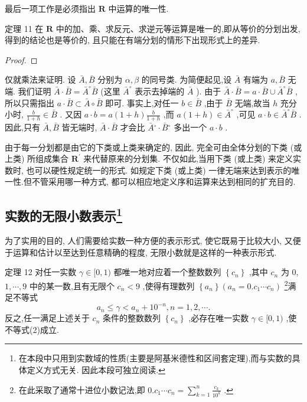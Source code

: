 最后一项工作是必须指出 \(\mathbf{R}\) 中运算的唯一性.

定理 11 在 \(\mathbf{R}\) 中的加、乘、求反元、求逆元等运算是唯一的,即从等价的分划出发, 得到的结论也是等价的, 且只能在有端分划的情形下出现形式上的差异.

\begin{proof}

\end{proof}
仅就乘法来证明. 设 \(\bar{A},\bar{B}\) 分别为 \(\alpha ,\beta\) 的同号类. 为简便起见,设 \(\bar{A}\) 有端为 \(a,\bar{B}\) 无端. 我们证明 \(\bar{A} \cdot  \bar{B} = {\bar{A}}^{ \circ  }\bar{B}\) (这里 \({\bar{A}}^{ \circ  }\) 表示去掉端的 \(\bar{A}\) ). 由于 \(\bar{A} \cdot  \bar{B} = a \cdot  \bar{B} \cup  {\bar{A}}^{ \circ  }\bar{B}\) ,所以只需指出 \(a \cdot  \bar{B} \subset  \bar{A} \circ  \bar{B}\) 即可. 事实上,对任一 \(b \in  \bar{B}\) ,由于 \(\bar{B}\) 无端,故当 \(h\) 充分小时, \(\frac{b}{1 + h} \in  \bar{B}\) . 又因 \(a \cdot  b = a\left( {1 + h}\right) \frac{b}{1 + h}\) ,而 \(a\left( {1 + h}\right)  \in  {\bar{A}}^{ \circ  }\) ,可见 \(a \cdot  b \in  {\bar{A}}^{ \circ  }\bar{B}\) . 因此,只有 \(\bar{A},\bar{B}\) 皆无端时, \(\bar{A} \cdot  \bar{B}\) 才会比 \(\bar{A}{}^{ \circ  } \cdot  \bar{B}{}^{ \circ  }\) 多出一个 \(a \cdot  b\) .

由于每一分划都是由它的下类或上类来确定的, 因此, 完全可由全体分划的下类 (或上类) 所组成集合 \({\mathbf{R}}^{\prime }\) 来代替原来的分划集. 不仅如此,当用下类 (或上类) 来定义实数时, 也可以硬性规定统一的形式. 如规定下类 (或上类) 一律无端来达到表示的唯一性.但不管采用哪一种方式, 都可以相应地定义序和运算来达到相同的扩充目的.

\subsection{实数的无限小数表示\footnote{在本段中只用到实数域的性质(主要是阿基米德性和区间套定理),而与实数的具体定义方式无关. 因此本段可独立阅读.}}

为了实用的目的, 人们需要给实数一种方便的表示形式, 使它既易于比较大小, 又便于运算和估计以至达到任意精确的程度, 无限小数就是这样的一种表示形式.

定理 12 对任一实数 \(\gamma  \in  \lbrack 0,1)\) 都唯一地对应着一个整数数列 \(\left\{  {c}_{n}\right\}\) ,其中 \({c}_{n}\) 为 0, \(1,\cdots ,9\) 中的某一数,且有无限个 \({c}_{n} < 9\) ,使得有理数列 \(\left\{  {a}_{n}\right\}  \left( {{a}_{n} = 0.{c}_{1}\cdots {c}_{n}}\right)\) \footnote{在此采取了通常十进位小数记法,即 \(0.{c}_{1}\cdots {c}_{n} = \mathop{\sum }\limits_{{k = 1}}^{n}\frac{{c}_{k}}{{10}^{k}}\) .}满足不等式
\[
{a}_{n} \leq  \gamma  < {a}_{n} + {10}^{-n},n = 1,2,\cdots . \tag{2}
\]
反之,任一满足上述关于 \({c}_{n}\) 条件的整数数列 \(\left\{  {c}_{n}\right\}\) ,必存在唯一实数 \(\gamma  \in  \lbrack 0,1)\) ,使不等式(2)成立.

